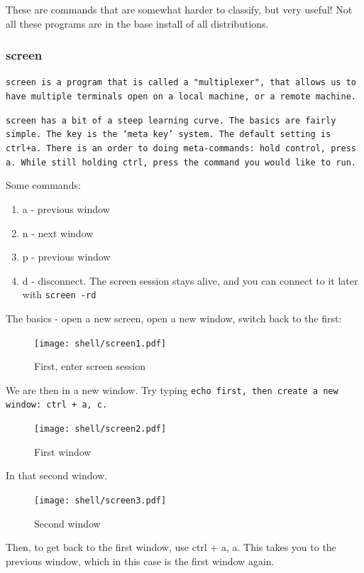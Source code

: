 These are commands that are somewhat harder to classify, but very useful! Not
all these programs are in the base install of all distributions.

\subsubsection {screen}

\tt{screen} is a program that is called a "multiplexer", that allows us to have multiple
terminals open on a local machine, or a remote machine. 

\tt{screen} has a bit of a steep learning curve. The basics are fairly simple. The
key is the `meta key' system. The default setting is ctrl+a. There is an order to doing
meta-commands: hold control, press a. While still holding ctrl, press the command
you would like to run.

Some commands:
\begin{enumerate}
	\item a - previous window
	\item n - next window
	\item p - previous window
	\item d - disconnect. The screen session stays alive, and you can connect to it later with \tt{screen -rd}
\end{enumerate}

The basics - open a new screen, open a new window, switch back to the first:

\begin{figure}
		\texttt{[image: shell/screen1.pdf]} 
		\caption{First, enter screen session}
		\label{screen1}
\end{figure}

We are then in a new window. Try typing \tt{echo first}, then create a new window: ctrl + a, c.

\begin{figure}
		\texttt{[image: shell/screen2.pdf]} 
		\caption{First window}
		\label{screen2}
\end{figure}

In that second window.

\begin{figure}
		\texttt{[image: shell/screen3.pdf]} 
		\caption{Second window}
		\label{screen3}
\end{figure}

Then, to get back to the first window, use ctrl + a, a. This takes you to the previous window, which
in this case is the first window again.

